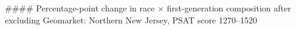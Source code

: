 #### Percentage-point change in race × first-generation composition after excluding Geomarket: Northern New Jersey, PSAT score 1270–1520
